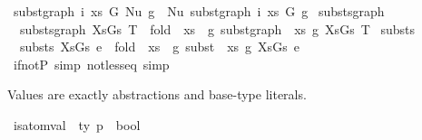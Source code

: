 \begin{isabellebody}
{\isacharbar}{\kern0pt}\ {\isachardoublequoteopen}subst{\isacharunderscore}{\kern0pt}graph\ i\ xs\ G\ {\isacharparenleft}{\kern0pt}Nu\ g{\isacharparenright}{\kern0pt}\ {\isacharequal}{\kern0pt}\ Nu\ {\isacharparenleft}{\kern0pt}subst{\isacharunderscore}{\kern0pt}graph\ i\ xs\ G\ g{\isacharparenright}{\kern0pt}{\isachardoublequoteclose}\isanewline
\isanewline
\isanewline
{}\isamarkupfalse%
\ substs{\isacharunderscore}{\kern0pt}graph{\isacharcolon}{\kern0pt}\isanewline
\ \ {\isachardoublequoteopen}substs{\isacharunderscore}{\kern0pt}graph\ XsGs\ T\ {\isacharequal}{\kern0pt}\ fold\ {\isacharparenleft}{\kern0pt}{\isasymlambda}\ {\isacharparenleft}{\kern0pt}{\isacharparenleft}{\kern0pt}xs{\isacharcomma}{\kern0pt}\ {\isacharunderscore}{\kern0pt}{\isacharparenright}{\kern0pt}{\isacharcomma}{\kern0pt}\ g{\isacharparenright}{\kern0pt}{\isachardot}{\kern0pt}\ subst{\isacharunderscore}{\kern0pt}graph\ {}\ xs\ g{\isacharparenright}{\kern0pt}\ XsGs\ T{\isachardoublequoteclose}\isanewline
\isanewline
{}\isamarkupfalse%
\ substs{\isacharcolon}{\kern0pt}\isanewline
\ \ {\isachardoublequoteopen}substs\ XsGs\ e\ {\isacharequal}{\kern0pt}\ fold\ {\isacharparenleft}{\kern0pt}{\isasymlambda}\ {\isacharparenleft}{\kern0pt}{\isacharparenleft}{\kern0pt}xs{\isacharcomma}{\kern0pt}\ {\isacharunderscore}{\kern0pt}{\isacharparenright}{\kern0pt}{\isacharcomma}{\kern0pt}\ g{\isacharparenright}{\kern0pt}{\isachardot}{\kern0pt}\ subst\ {}\ xs\ g{\isacharparenright}{\kern0pt}\ XsGs\ e{\isachardoublequoteclose}\isanewline
\isanewline
\isanewline
\isanewline
\isanewline
\isanewline
{}\isamarkupfalse%
\ if{\isacharunderscore}{\kern0pt}not{\isacharunderscore}{\kern0pt}P\ {\isacharbrackleft}{\kern0pt}simp{\isacharbrackright}{\kern0pt}\ not{\isacharunderscore}{\kern0pt}less{\isacharunderscore}{\kern0pt}eq\ {\isacharbrackleft}{\kern0pt}simp{\isacharbrackright}{\kern0pt}\isanewline
\ \ %
%
\isadelimdocument
%
\endisadelimdocument
%
\isatagdocument
%
\isamarkuptrue%
%
\endisatagdocument
{\isafolddocument}%
%
\isadelimdocument
%
\endisadelimdocument
%
\begin{isamarkuptext}%
Values are exactly abstractions and base-type literals.%
\end{isamarkuptext}\isamarkuptrue%
\isamarkupfalse%
\ is{\isacharunderscore}{\kern0pt}atom{\isacharunderscore}{\kern0pt}val\ {\isacharcolon}{\kern0pt}{\isacharcolon}{\kern0pt}\ {\isachardoublequoteopen}{\isacharprime}{\kern0pt}ty\ p\ {\isacharequal}{\kern0pt}{\isachargreater}{\kern0pt}\ bool{\isachardoublequoteclose}\ \isanewline

\end{isabellebody}
